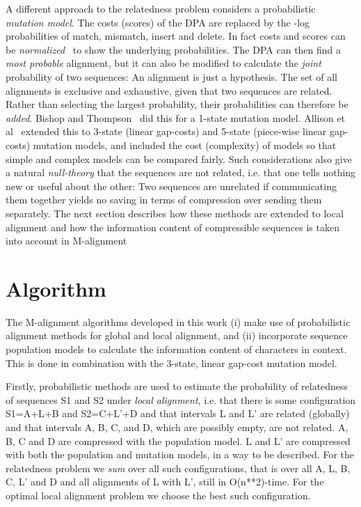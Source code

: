 \documentclass[letterpaper,11pt,oneside]{article}
\begin{document}
A different approach to the relatedness problem
considers a probabilistic {\em mutation model}.
The costs (scores) of the DPA are replaced by the -log probabilities
of match, mismatch, insert and delete.
In fact costs and scores can be {\em normalized}~\cite{allison93a} to show
the underlying probabilities.
The DPA can then find a {\em most probable} alignment, but it can also
be modified to calculate the {\em joint} probability of two sequences:
An alignment is just a hypothesis.
The set of all alignments is exclusive and exhaustive, given that
two sequences are related.
Rather than selecting the largest probability,
their probabilities can therefore be {\em added}.
Bishop and Thompson~\cite{bishop86} did this for a 1-state mutation model.
Allison et al~\cite{allison92a} extended this to 3-state (linear gap-costs)
and 5-state (piece-wise linear gap-costs) mutation models,
and included the cost (complexity) of models so that simple
and complex models can be compared fairly.
Such considerations also give
a natural {\em null-theory} that the sequences are not related,
i.e. that one tells nothing new or useful about the other:
Two sequences are unrelated if
communicating them together yields no saving in terms
of compression over sending them separately.
The next section describes how these methods
are extended to local alignment and how the information
content of compressible sequences is taken into account in M-alignment


\section{Algorithm} \label{sec:alg}

The M-alignment algorithms developed in this work
(i) make use of probabilistic alignment methods
for global and local alignment, and
(ii) incorporate sequence population models to calculate
the information content of characters in context.
This is done in combination with the 3-state, linear gap-cost mutation model.

Firstly,
probabilistic methods are used to estimate the probability of relatedness
of sequences S1 and S2 under {\em local alignment}, i.e. that there is some
configuration S1=A+L+B and S2=C+L'+D and that intervals L and L' are
related (globally) and that intervals A, B, C, and D, which are possibly empty,
are not related.
A, B, C and D are compressed with the population model.
L and L' are compressed with both the population and mutation models,
in a way to be described.
For the relatedness problem we {\em sum} over all such configurations,
that is over all A, L, B, C, L' and D and all alignments of L with L',
still in O(n**2)-time.
For the optimal local alignment problem we choose the best such configuration.
\end{document}
